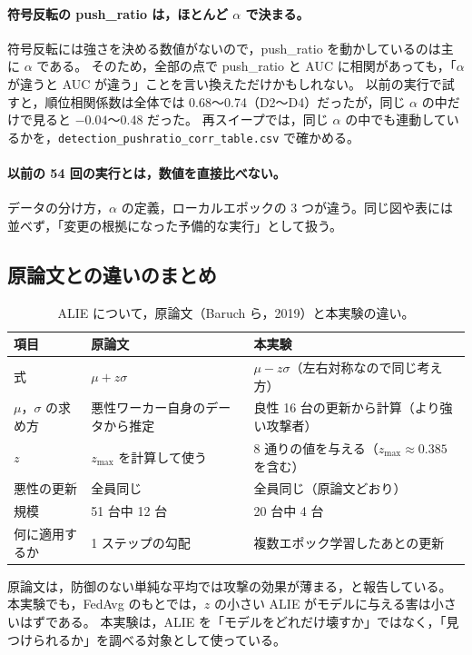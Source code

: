 \documentclass[a4j, dvipdfmx]{jsarticle}  %
\begin{document}
\paragraph{符号反転の push\_ratio は，ほとんど $\alpha$ で決まる。}
符号反転には強さを決める数値がないので，push\_ratio を動かしているのは主に $\alpha$ である。
そのため，全部の点で push\_ratio と AUC に相関があっても，「$\alpha$ が違うと AUC が違う」ことを言い換えただけかもしれない。
以前の実行で試すと，順位相関係数は全体では 0.68〜0.74（D2〜D4）だったが，同じ $\alpha$ の中だけで見ると $-0.04$〜0.48 だった。
再スイープでは，同じ $\alpha$ の中でも連動しているかを，\texttt{detection\_pushratio\_corr\_table.csv} で確かめる。

\paragraph{以前の 54 回の実行とは，数値を直接比べない。}
データの分け方，$\alpha$ の定義，ローカルエポックの 3 つが違う。同じ図や表には並べず，「変更の根拠になった予備的な実行」として扱う。

\subsection{原論文との違いのまとめ}

\begin{table}[H]
\centering
\caption{ALIE について，原論文（Baruch ら，2019）と本実験の違い。}
\begin{tabular}{@{}P{3.6cm} P{5.4cm} P{6.3cm}@{}}
\toprule
項目 & 原論文 & 本実験 \\
\midrule
式 & $\mu + z\sigma$ & $\mu - z\sigma$（左右対称なので同じ考え方） \\
$\mu$，$\sigma$ の求め方 & 悪性ワーカー自身のデータから推定 & 良性 16 台の更新から計算（より強い攻撃者） \\
$z$ & $z_{\max}$ を計算して使う & 8 通りの値を与える（$z_{\max} \approx 0.385$ を含む） \\
悪性の更新 & 全員同じ & 全員同じ（原論文どおり） \\
規模 & 51 台中 12 台 & 20 台中 4 台 \\
何に適用するか & 1 ステップの勾配 & 複数エポック学習したあとの更新 \\
\bottomrule
\end{tabular}
\end{table}

原論文は，防御のない単純な平均では攻撃の効果が薄まる，と報告している。
本実験でも，FedAvg のもとでは，$z$ の小さい ALIE がモデルに与える害は小さいはずである。
本実験は，ALIE を「モデルをどれだけ壊すか」ではなく，「見つけられるか」を調べる対象として使っている。
\end{document}
